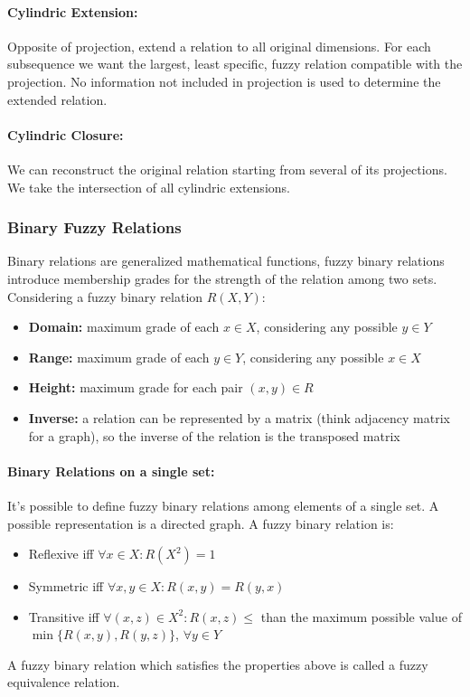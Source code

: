  \paragraph{Cylindric Extension:} Opposite of projection, extend a relation to all original dimensions. For each subsequence we want the largest, least specific, fuzzy relation compatible with the projection. No information not included in projection is used to determine the extended relation.\\
 
 \paragraph{Cylindric Closure:} We can reconstruct the original relation starting from several of its projections. We take the intersection of all cylindric extensions.\\
 
\subsubsection{Binary Fuzzy Relations}
Binary relations are generalized mathematical functions, fuzzy binary relations introduce membership grades for the strength of the relation among two sets.\\

Considering a fuzzy binary relation $R(X,Y)$:
\begin{itemize}
	\item \textbf{Domain:} maximum grade of each $x \in X$, considering any possible $y \in Y$
	\item \textbf{Range:} maximum grade of each $y \in Y$, considering any possible $x \in X$
	\item \textbf{Height:} maximum grade for each pair $(x,y) \in R$
	\item \textbf{Inverse:} a relation can be represented by a matrix (think adjacency matrix for a graph), so the inverse of the relation is the transposed matrix
\end{itemize}

\paragraph{Binary Relations on a single set:} It's possible to define fuzzy binary relations among elements of a single set. A possible representation is a directed graph. A fuzzy binary relation is:
\begin{itemize}
	\item Reflexive iff $\forall x \in X: R(X^2) = 1$
	\item Symmetric iff $\forall x,y \in X: R(x,y) = R(y,x)$
	\item Transitive iff $\forall (x,z) \in X^2: R(x,z) \leq$ than the maximum possible value of $\min \{R(x,y), R(y,z)\}$, $\forall y \in Y$
\end{itemize}
A fuzzy binary relation which satisfies the properties above is called a fuzzy equivalence relation.\\

